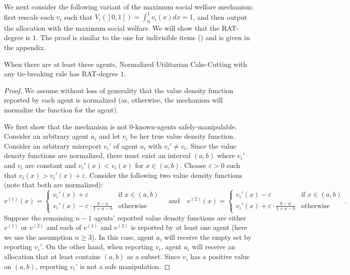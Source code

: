 We next consider the following variant of the maximum social welfare mechanism:
first rescale each $v_i$ such that $V_i([0,1])=\int_0^1v_i(x)dx=1$, and then output the allocation with the maximum social welfare.
We will show that the RAT-degree is $1$.
The proof is similar to the one for indivisible items () and is given in the appendix.

\begin{theoremrep}
When there are at least three agents,
Normalized Utilitarian Cake-Cutting with any tie-breaking rule has RAT-degree $1$.
\end{theoremrep}
\begin{proof}
    We assume without loss of generality that the value density function reported by each agent is normalized (as, otherwise, the mechanism will normalize the function for the agent).
    
    We first show that the mechanism is not $0$-known-agents safely-manipulable.
    Consider an arbitrary agent $a_i$ and let $v_i$ be her true value density function.
    Consider an arbitrary misreport $v_i'$ of agent $a_i$ with $v_i'\neq v_i$.
    Since the value density functions are normalized, there must exist an interval $(a,b)$ where $v_i'$ and $v_i$ are constant and $v_i'(x)<v_i(x)$ for $x\in(a,b)$.
    Choose $\varepsilon>0$ such that $v_i(x)>v_i'(x)+\varepsilon$.
    Consider the following two value density functions (note that both are normalized):
    $$v^{(1)}(x)=\left\{\begin{array}{ll}
        v_i'(x)+\varepsilon & \mbox{if }x\in(a,b) \\
        v_i'(x)-\varepsilon\cdot\frac{b-a}{1+a-b} & \mbox{otherwise}
    \end{array}\right. \quad\mbox{and}\quad v^{(2)}(x)=\left\{\begin{array}{ll}
        v_i'(x)-\varepsilon & \mbox{if }x\in(a,b) \\
        v_i'(x)+\varepsilon\cdot\frac{b-a}{1+a-b} & \mbox{otherwise}
    \end{array}\right..$$
    Suppose the remaining $n-1$ agents' reported value density functions are either $v^{(1)}$ or $v^{(2)}$ and each of $v^{(1)}$ and $v^{(2)}$ is reported by at least one agent (here we use the assumption $n\geq 3$).
    In this case, agent $a_i$ will receive the empty set by reporting $v_i'$.
    On the other hand, when reporting $v_i$, agent $a_i$ will receive an allocation that at least contains $(a,b)$ as a subset.
    Since $v_i$ has a positive value on $(a,b)$, reporting $v_i'$ is not a safe manipulation.


\end{proof}
